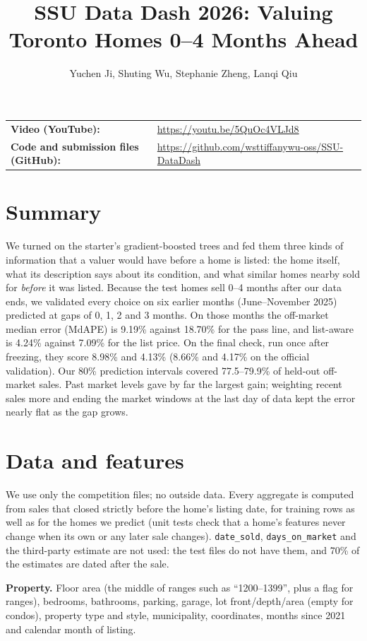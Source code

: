 \documentclass[11pt]{article}
\title{SSU Data Dash 2026: Valuing Toronto Homes 0--4 Months Ahead}
\author{Yuchen Ji, Shuting Wu, Stephanie Zheng, Lanqi Qiu}
\date{}
\begin{document}
\maketitle

\noindent\begin{tabular}{@{}ll}
\textbf{Video (YouTube):} & \url{https://youtu.be/5QuOc4VLJd8} \\
\textbf{Code and submission files (GitHub):} & \url{https://github.com/wsttiffanywu-oss/SSU-DataDash} \\
\end{tabular}

\section*{Summary}
We turned on the starter's gradient-boosted trees and fed them three kinds of information that a
valuer would have before a home is listed: the home itself, what its description says about its
condition, and what similar homes nearby sold for \emph{before} it was listed. Because the test homes
sell 0--4 months after our data ends, we validated every choice on six earlier months
(June--November 2025) predicted at gaps of 0, 1, 2 and 3 months. On those months the off-market median error (MdAPE) is
9.19\% against 18.70\% for the pass line, and list-aware is 4.24\% against 7.09\% for the list price.
On the final check, run once after freezing, they score 8.98\% and 4.13\% (8.66\% and 4.17\% on the
official validation). Our 80\% prediction intervals covered 77.5--79.9\% of held-out off-market sales. Past market levels
gave by far the largest gain; weighting recent sales more and ending the market windows at the last
day of data kept the error nearly flat as the gap grows.

\section{Data and features}
We use only the competition files; no outside data. Every aggregate is computed from sales that
closed strictly before the home's listing date, for training rows as well as for the homes we
predict (unit tests check that a home's features never change when its own or any later sale
changes). \texttt{date\_sold}, \texttt{days\_on\_market} and the third-party estimate are not used: the
test files do not have them, and 70\% of the estimates are dated after the sale.

\textbf{Property.} Floor area (the middle of ranges such as ``1200--1399'', plus a flag for ranges),
bedrooms, bathrooms, parking, garage, lot front/depth/area (empty for condos), property type and
style, municipality, coordinates, months since 2021 and calendar month of listing.
\end{document}
